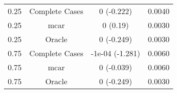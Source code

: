 \begin{table}[ht]
\centering
\begin{tabular}{cccc}
  \hline
  \hline
0.25 & Complete Cases & 0 (-0.222) & 0.0040 \\ 
  0.25 & mcar & 0 (0.19) & 0.0030 \\ 
  0.25 & Oracle & 0 (-0.249) & 0.0030 \\ 
  0.75 & Complete Cases & -1e-04 (-1.281) & 0.0060 \\ 
  0.75 & mcar & 0 (-0.039) & 0.0060 \\ 
  0.75 & Oracle & 0 (-0.249) & 0.0030 \\ 
   \hline
\end{tabular}
\end{table}
